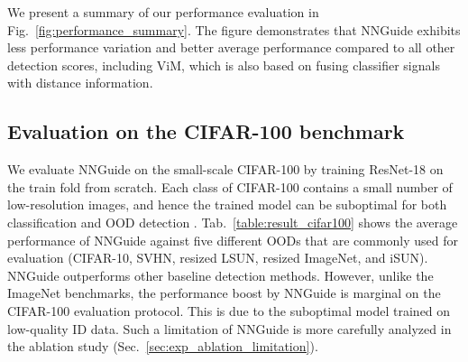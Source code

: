 \documentclass[10pt,twocolumn,letterpaper]{article}
\begin{document}
We present a summary of our performance evaluation in Fig.~\ref{fig:performance_summary}. The figure demonstrates that NNGuide exhibits less performance variation and better average performance compared to all other detection scores, including ViM, which is also based on fusing classifier signals with distance information.

\begin{table}[t]
\centering
{}
\caption{
Results on the CIFAR-100 benchmark with the ResNet-18 model trained on CIFAR-100 from scratch, achieving 75.66\% ID accuracy. The average performance across five different OODs is reported.}
\label{table:result_cifar100}
\end{table}

\subsection{Evaluation on the CIFAR-100 benchmark}

We evaluate NNGuide on the small-scale CIFAR-100 by training ResNet-18 on the train fold from scratch. Each class of CIFAR-100 contains a small number of low-resolution images, and hence the trained model can be suboptimal for both classification and OOD detection \cite{vaze2021open}. Tab.~\ref{table:result_cifar100} shows the average performance of NNGuide against five different OODs that are commonly used for evaluation (\ie CIFAR-10, SVHN, resized LSUN, resized ImageNet, and iSUN). NNGuide outperforms other baseline detection methods. However, unlike the ImageNet benchmarks, the performance boost by NNGuide is marginal on the CIFAR-100 evaluation protocol. This is due to the suboptimal model trained on low-quality ID data. Such a limitation of NNGuide is more carefully analyzed in the ablation study (Sec.~\ref{sec:exp_ablation_limitation}).
\end{document}
